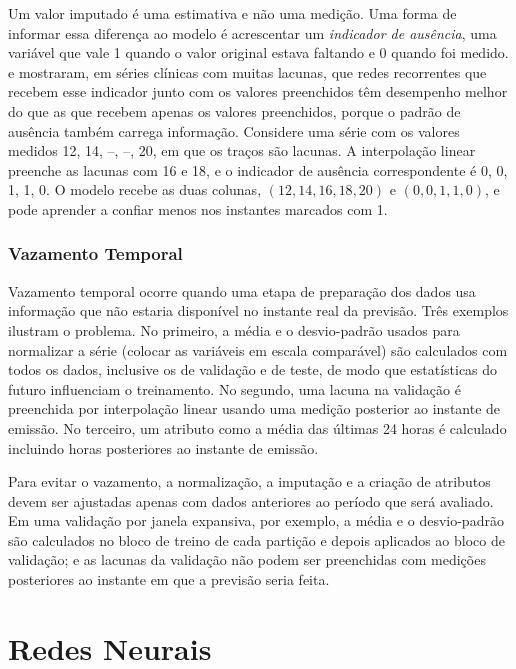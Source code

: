 Um valor imputado é uma estimativa e não uma medição. Uma forma de informar essa diferença ao modelo é acrescentar um \emph{indicador de ausência}, uma variável que vale 1 quando o valor original estava faltando e 0 quando foi medido.  e  mostraram, em séries clínicas com muitas lacunas, que redes recorrentes que recebem esse indicador junto com os valores preenchidos têm desempenho melhor do que as que recebem apenas os valores preenchidos, porque o padrão de ausência também carrega informação. Considere uma série com os valores medidos 12, 14, --, --, 20, em que os traços são lacunas. A interpolação linear preenche as lacunas com 16 e 18, e o indicador de ausência correspondente é 0, 0, 1, 1, 0. O modelo recebe as duas colunas, \((12, 14, 16, 18, 20)\) e \((0, 0, 1, 1, 0)\), e pode aprender a confiar menos nos instantes marcados com 1.

\subsubsection{Vazamento Temporal}

Vazamento temporal ocorre quando uma etapa de preparação dos dados usa informação que não estaria disponível no instante real da previsão. Três exemplos ilustram o problema. No primeiro, a média e o desvio-padrão usados para normalizar a série (colocar as variáveis em escala comparável) são calculados com todos os dados, inclusive os de validação e de teste, de modo que estatísticas do futuro influenciam o treinamento. No segundo, uma lacuna na validação é preenchida por interpolação linear usando uma medição posterior ao instante de emissão. No terceiro, um atributo como a média das últimas 24 horas é calculado incluindo horas posteriores ao instante de emissão.

Para evitar o vazamento, a normalização, a imputação e a criação de atributos devem ser ajustadas apenas com dados anteriores ao período que será avaliado. Em uma validação por janela expansiva, por exemplo, a média e o desvio-padrão são calculados no bloco de treino de cada partição e depois aplicados ao bloco de validação; e as lacunas da validação não podem ser preenchidas com medições posteriores ao instante em que a previsão seria feita.

\section{Redes Neurais}
\label{sec:redes_neurais_deep_learning}

